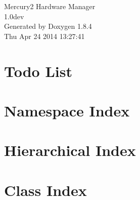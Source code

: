 \documentclass[twoside]{book}
\newcommand{\clearemptydoublepage}{%
  \newpage{\pagestyle{empty}\cleardoublepage}%
}
\begin{document}
\hypersetup{pageanchor=false}
\begin{titlepage}
\vspace*{7cm}
\begin{center}%
{\Large Mercury2 Hardware Manager \\[1ex]\large 1.\-0dev }\\
\vspace*{1cm}
{\large Generated by Doxygen 1.8.4}\\
\vspace*{0.5cm}
{\small Thu Apr 24 2014 13:27:41}\\
\end{center}
\end{titlepage}
\clearemptydoublepage
\tableofcontents
\clearemptydoublepage
{}
\hypersetup{pageanchor=true}

\chapter{Todo List}
\label{todo}
\hypertarget{todo}{}

\chapter{Namespace Index}

\chapter{Hierarchical Index}

\chapter{Class Index}

\end{document}
